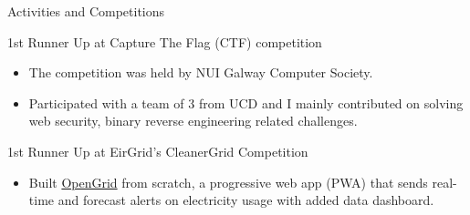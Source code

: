 \documentclass{article}
\newlength{\tabin}
\newlength{\secsep}
\newcommand{\lineunder}{\vspace*{-8pt} \\ \hspace*{-6pt} \hrulefill \\ \vspace*{-15pt}}
\newenvironment{tabbedsection}[1]{
  \begin{list}{}{
      \setlength{\itemsep}{0pt}
      \setlength{\labelsep}{0pt}
      \setlength{\labelwidth}{0pt}
      \setlength{\leftmargin}{\tabin}
      \setlength{\rightmargin}{\tabin}
      \setlength{\listparindent}{0pt}
      \setlength{\parsep}{0pt}
      \setlength{\parskip}{0pt}
      \setlength{\partopsep}{0pt}
      \setlength{\topsep}{#1}
    }
  \item[]
}{\end{list}}
\newenvironment{resume_section}[1]{
  \filbreak
  \vspace{2\secsep}
  \textsc{\large#1}
  \lineunder
  \begin{tabbedsection}{\secsep}
}{\end{tabbedsection}}
\newenvironment{resume_subsection}[2][]{
  \textbf{#2} \hfill {\footnotesize #1} \hspace{2em}
  \begin{tabbedsection}{0.5\secsep}
}{\end{tabbedsection}}
\newenvironment{subitems}{
  \renewcommand{\labelitemi}{-}
  \begin{itemize}
      \setlength{\labelsep}{1em}
}{\end{itemize}}
\begin{document}
\begin{resume_section}{Activities and Competitions}
  \begin{resume_subsection}{{1st Runner Up at Capture The Flag (CTF) competition}}
    \begin{subitems}
      \item The competition was held by NUI Galway Computer Society.
      \item Participated with a team of 3 from UCD and I mainly contributed on solving web security, binary reverse engineering related challenges. 
    \end{subitems}
  \end{resume_subsection}

  \begin{resume_subsection}{{1st Runner Up at EirGrid's CleanerGrid Competition}}
    \begin{subitems}
      \item Built \href{https://opengrid.marcustut.me}{OpenGrid} from scratch, a progressive web app (PWA) that sends real-time and forecast alerts on electricity usage with added data dashboard.
    \end{subitems}
  \end{resume_subsection}
  



\end{resume_section}
\end{document}
